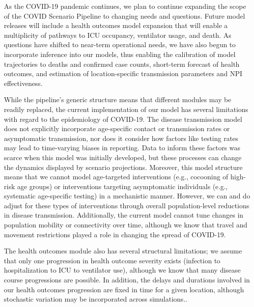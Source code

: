 As the COVID-19 pandemic continues, we plan to continue expanding the scope of the COVID Scenario Pipeline to changing needs and questions. Future model releases will include a health outcomes model expansion that will enable a multiplicity of pathways to ICU occupancy, ventilator usage, and death. As questions have shifted to near-term operational needs, we have also begun to incorporate inference into our models, thus enabling the calibration of model trajectories to deaths and confirmed case counts, short-term forecast of health outcomes, and estimation of location-specific transmission parameters and NPI effectiveness.

While the pipeline’s generic structure means that different modules may be readily replaced, the current implementation of our model has several limitations with regard to the epidemiology of COVID-19. The disease transmission model does not explicitly incorporate age-specific contact or transmission rates or asymptomatic transmission, nor does it consider how factors like testing rates may lead to time-varying biases in reporting. Data to inform these factors was scarce when this model was initially developed, but these processes can change the dynamics displayed by scenario projections. Moreover, this model structure means that we cannot model age-targeted interventions (e.g., cocooning of high-risk age groups) or interventions targeting asymptomatic individuals (e.g., systematic age-specific testing) in a mechanistic manner. However, we can and do adjust for these types of interventions through overall population-level reductions in disease transmission. Additionally, the current model cannot tune changes in population mobility or connectivity over time, although we know that travel and movement restrictions played a role in changing the spread of COVID-19.

The health outcomes module also has several structural limitations; we assume that only one progression in health outcome severity exists (infection to hospitalization to ICU to ventilator use), although we know that many disease course progressions are possible. In addition, the delays and durations involved in our health outcomes progression are fixed in time for a given location, although stochastic variation may be incorporated across simulations..

